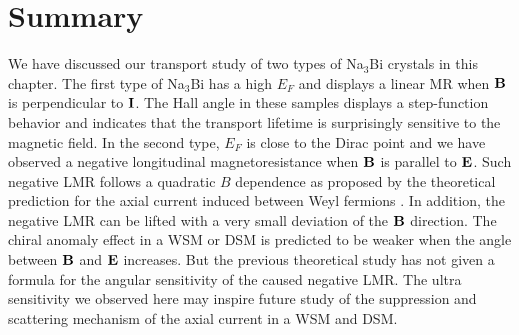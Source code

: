 \section{Summary}
\label{sec:na3bi:summary}


We have discussed our transport study of two types of Na$_3$Bi crystals in this chapter. The first type of Na$_3$Bi has a high $E_F$ and displays a linear MR when $\bf B$ is perpendicular to $\bf I$. The Hall angle in these samples displays a step-function behavior and indicates that the transport lifetime is surprisingly sensitive to the magnetic field. In the second type, $E_F$ is close to the Dirac point and we have observed a negative longitudinal magnetoresistance when $\bf B$ is parallel to $\bf E$. Such negative LMR follows a quadratic $B$ dependence as proposed by the theoretical prediction for the axial current induced between Weyl fermions \cite{Son2013}. In addition, the negative LMR can be lifted with a very small deviation of the $\bf B$ direction. The chiral anomaly effect in a WSM or DSM is predicted to be weaker when the angle between $\bf B$ and $\bf E$ increases. But the previous theoretical study has not given a formula for the angular sensitivity of the caused negative LMR. The ultra sensitivity we observed here may inspire future study of the suppression and scattering mechanism of the axial current in a WSM and DSM.